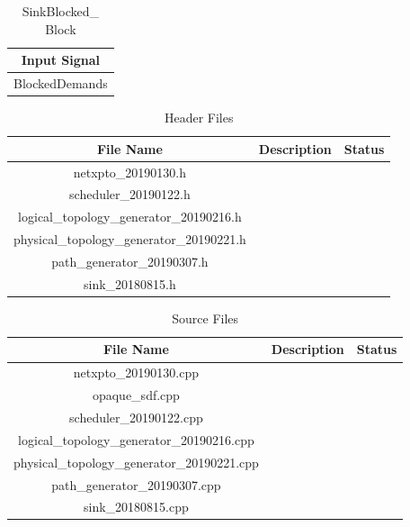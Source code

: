 \begin{table}[H]
	\centering
	\begin{tabular}{| c |}
		\hline
		\textbf{Input Signal}\\ \hline
		BlockedDemands       \\ \hline
	\end{tabular}
	\caption{SinkBlocked\_ Block}
	\label{sink_blocked_block_opaque}
\end{table}

\begin{table}[H]
	\centering
	\begin{tabular}{| c | c | c |}
		\hline
		\textbf{File Name}                        & \textbf{Description} & Status\\ \hline
		netxpto\_20190130.h                       &                      &       \\ \hline
		scheduler\_20190122.h                     &                      &       \\ \hline
		logical\_topology\_generator\_20190216.h  &                      &       \\ \hline
		physical\_topology\_generator\_20190221.h &                      &       \\ \hline
		path\_generator\_20190307.h               &                      &       \\ \hline
		sink\_20180815.h                          &                      &       \\ \hline
	\end{tabular}
	\caption{Header Files}
	\label{header_files_opaque}
\end{table}

\begin{table}[H]
	\centering
	\begin{tabular}{| c | c | c |}
		\hline
		\textbf{File Name}                          & \textbf{Description} & Status\\ \hline
		netxpto\_20190130.cpp                       &                      &       \\ \hline
		opaque\_sdf.cpp                             &                      &       \\ \hline
		scheduler\_20190122.cpp                     &                      &       \\ \hline
		logical\_topology\_generator\_20190216.cpp  &                      &       \\ \hline
		physical\_topology\_generator\_20190221.cpp &                      &       \\ \hline
		path\_generator\_20190307.cpp               &                      &       \\ \hline
		sink\_20180815.cpp                          &                      &       \\ \hline
	\end{tabular}
	\caption{Source Files}
	\label{source_files_opaque}
\end{table}
